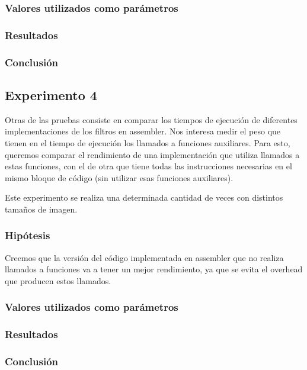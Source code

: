 		\subsubsection{Valores utilizados como parámetros} 

		\subsubsection{Resultados}

		\subsubsection{Conclusión}


	\subsection{Experimento 4}
		Otras de las pruebas consiste en comparar los tiempos de ejecución de diferentes implementaciones de los filtros en assembler. Nos interesa medir el peso que tienen en el tiempo de ejecución los llamados a funciones auxiliares. Para esto, queremos comparar el rendimiento de una implementación que utiliza llamados a estas funciones, con el de otra que tiene todas las instrucciones necesarias en el mismo bloque de código (sin utilizar esas funciones auxiliares). 
		
		Este experimento se realiza una determinada cantidad de veces con distintos tamaños de imagen.

		\subsubsection{Hipótesis} 
			Creemos que la versión del código implementada en assembler que no realiza llamados a funciones va a tener un mejor rendimiento, ya que se evita el overhead que producen estos llamados.
		
		\subsubsection{Valores utilizados como parámetros} 

		\subsubsection{Resultados}

		\subsubsection{Conclusión}		